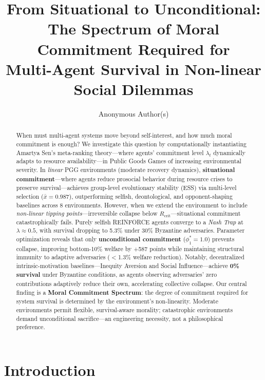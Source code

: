 \documentclass{article}
\title{From Situational to Unconditional:\\The Spectrum of Moral Commitment Required for\\Multi-Agent Survival in Non-linear Social Dilemmas}
\author{Anonymous Author(s)}
\begin{document}
\maketitle

\begin{abstract}
When must multi-agent systems move beyond self-interest, and how much moral commitment is enough?
We investigate this question by computationally instantiating Amartya Sen's meta-ranking theory---where agents' commitment level $\lambda_t$ dynamically adapts to resource availability---in Public Goods Games of increasing environmental severity.
In \emph{linear} PGG environments (moderate recovery dynamics), \textbf{situational commitment}---where agents reduce prosocial behavior during resource crises to preserve survival---achieves group-level evolutionary stability (ESS) via multi-level selection ($\bar{x}=0.987$), outperforming selfish, deontological, and opponent-shaping baselines across 8 environments.
However, when we extend the environment to include \emph{non-linear tipping points}---irreversible collapse below $R_{\text{crit}}$---situational commitment catastrophically fails.
Purely selfish REINFORCE agents converge to a \emph{Nash Trap} at $\lambda \approx 0.5$, with survival dropping to 5.3\% under 30\% Byzantine adversaries.
Parameter optimization reveals that only \textbf{unconditional commitment} ($\phi_1^* = 1.0$) prevents collapse, improving bottom-10\% welfare by +587 points while maintaining structural immunity to adaptive adversaries ($<$1.3\% welfare reduction).
Notably, decentralized intrinsic-motivation baselines---Inequity Aversion and Social Influence---achieve \textbf{0\% survival} under Byzantine conditions, as agents observing adversaries' zero contributions adaptively reduce their own, accelerating collective collapse.
Our central finding is a \textbf{Moral Commitment Spectrum}: the degree of commitment required for system survival is determined by the environment's non-linearity.
Moderate environments permit flexible, survival-aware morality; catastrophic environments demand unconditional sacrifice---an engineering necessity, not a philosophical preference.
\end{abstract}

\section{Introduction}
\end{document}
